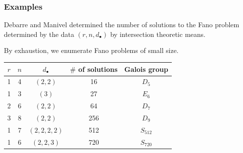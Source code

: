 \documentclass{beamer}
\newcommand{\new}[1]{{\color{black!10!blue}#1}}
\begin{document}
\begin{frame}
\frametitle{Examples}
Debarre and Manivel determined the number of solutions to the Fano problem determined by the data $(r,n,d_\bullet)$ by intersection theoretic means.

By exhaustion, we enumerate Fano problems of small size.

\begin{table}[htb]
  \label{Small Fano}
  \def\arraystretch{1.1}
  \begin{tabular}{||c|c|c|c|c||}
    \hline
    $r$ & $n$ & $d_\bullet$ & $\#$ of solutions & Galois group\\
    \hline\hline
    1 & 4 & $(2,2)$ & 16 & $D_5$\\
    \hline
    1 & 3 & $(3)$ & 27 & $E_6$\\
    \hline
    2 & 6 & $(2,2)$ & 64 & $D_7$\\
    \hline
    3 & 8 & $(2,2)$ & 256 & $D_9$\\
    \hline
    1 & 7 & $(2,2,2,2)$ & 512 & \new{$S_{512}$}\\
    \hline
    1 & 6 & $(2,2,3)$ & 720  & \new{$S_{720}$}\\
    \hline
  \end{tabular}
\end{table}
\end{frame}
\end{document}
